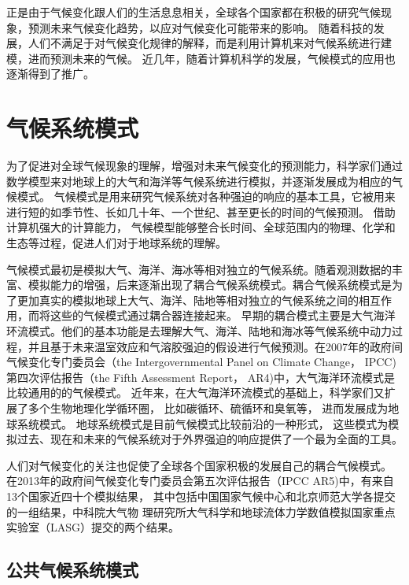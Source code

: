  
正是由于气候变化跟人们的生活息息相关，全球各个国家都在积极的研究气候现象，预测未来气候变化趋势，以应对气候变化可能带来的影响。 
随着科技的发展，人们不满足于对气候变化规律的解释，而是利用计算机来对气候系统进行建模，进而预测未来的气候。
近几年，随着计算机科学的发展，气候模式的应用也逐渐得到了推广。  



 
\section{气候系统模式}

为了促进对全球气候现象的理解，增强对未来气候变化的预测能力，科学家们通过数学模型来对地球上的大气和海洋等气候系统进行模拟，并逐渐发展成为相应的气候模式。
气候模式是用来研究气候系统对各种强迫的响应的基本工具，它被用来进行短的如季节性、长如几十年、一个世纪、甚至更长的时间的气候预测。 
借助计算机强大的计算能力， 气候模型能够整合长时间、全球范围内的物理、化学和生态等过程，促进人们对于地球系统的理解\cite{hurrell2013community}。


气候模式最初是模拟大气、海洋、海冰等相对独立的气候系统。随着观测数据的丰富、模拟能力的增强，后来逐渐出现了耦合气候系统模式。耦合气候系统模式是为了更加真实的模拟地球上大气、海洋、陆地等相对独立的气候系统之间的相互作用，而将这些的气候模式通过耦合器连接起来。
早期的耦合模式主要是大气海洋环流模式。他们的基本功能是去理解大气、海洋、陆地和海冰等气候系统中动力过程，并且基于未来温室效应和气溶胶强迫的假设进行气候预测。在2007年的政府间气候变化专门委员会（the
Intergovernmental Panel on Climate Change， IPCC) 第四次评估报告（the Fifth Assessment
Report， AR4)中，大气海洋环流模式是比较通用的的气候模式\cite{solomon2007climate}。
近年来，在大气海洋环流模式的基础上，科学家们又扩展了多个生物地理化学循环圈， 比如碳循环、硫循环和臭氧等， 进而发展成为地球系统模式。 地球系统模式是目前气候模式比较前沿的一种形式，
这些模式为模拟过去、现在和未来的气候系统对于外界强迫的响应提供了一个最为全面的工具。 

人们对气候变化的关注也促使了全球各个国家积极的发展自己的耦合气候模式。
在2013年的政府间气候变化专门委员会第五次评估报告（IPCC AR5)中，有来自13个国家近四十个模拟结果，
其中包括中国国家气候中心和北京师范大学各提交的一组结果，中科院大气物
理研究所大气科学和地球流体力学数值模拟国家重点实验室（LASG）提交的两个结果\cite{stocker2013ipcc}。



\subsection{公共气候系统模式}
 

